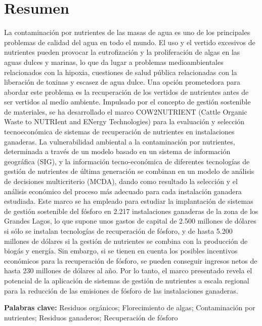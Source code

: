 \newpage

\section*{Resumen}
La contaminación por nutrientes de las masas de agua es uno de los principales problemas de calidad del agua en todo el mundo. El uso y el vertido excesivos de nutrientes pueden provocar la eutrofización y la proliferación de algas en las aguas dulces y marinas, lo que da lugar a problemas medioambientales relacionados con la hipoxia, cuestiones de salud pública relacionadas con la liberación de toxinas y escasez de agua dulce. Una opción prometedora para abordar este problema es la recuperación de los vertidos de nutrientes antes de ser vertidos al medio ambiente. Impulsado por el concepto de gestión sostenible de materiales, se ha desarrollado el marco COW2NUTRIENT (Cattle Organic Waste to NUTRIent and ENergy Technologies) para la evaluación y selección tecnoeconómica de sistemas de recuperación de nutrientes en instalaciones ganaderas. La vulnerabilidad ambiental a la contaminación por nutrientes, determinada a través de un modelo basado en un sistema de información geográfica (SIG), y la información tecno-económica de diferentes tecnologías de gestión de nutrientes de última generación se combinan en un modelo de análisis de decisiones multicriterio (MCDA), dando como resultado la selección y el análisis económico del proceso más adecuado para cada instalación ganadera estudiada. Este marco se ha empleado para estudiar la implantación de sistemas de gestión sostenible del fósforo en 2.217 instalaciones ganaderas de la zona de los Grandes Lagos, lo que supone unos gastos de capital de 2.500 millones de dólares si sólo se instalan tecnologías de recuperación de fósforo, y de hasta 5.200 millones de dólares si la gestión de nutrientes se combina con la producción de biogás y energía. Sin embargo, si se tienen en cuenta los posibles incentivos económicos para la recuperación de fósforo, se pueden conseguir ingresos netos de hasta 230 millones de dólares al año. Por lo tanto, el marco presentado revela el potencial de la aplicación de sistemas de gestión de nutrientes a escala regional para la reducción de las emisiones de fósforo de las instalaciones ganaderas.

\bigskip
\textbf{Palabras clave:} Residuos orgánicos; Florecimiento de algas; Contaminación por nutrientes; Residuos ganaderos; Recuperación de fósforo

\newpage

